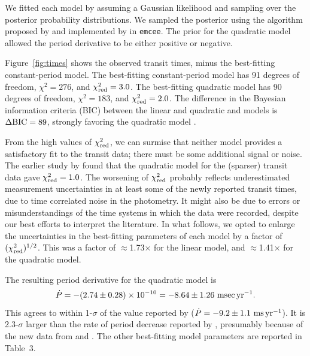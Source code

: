 \documentclass[12pt,twocolumn,tighten]{aastex62}
\begin{document}
We fitted each model by assuming a Gaussian likelihood and
sampling over the posterior probability distributions.  We sampled the
posterior using the algorithm proposed by
\citet{goodman_ensemble_2010} and implemented by
\citet{foreman-mackey_emcee_2013} in \texttt{emcee}.  The prior for
the quadratic model allowed the period derivative to be either positive
or negative.

Figure~\ref{fig:times} shows the observed transit times, minus the
best-fitting constant-period model.  The best-fitting constant-period
model has 91 degrees of freedom, $\chi^2 = 276$, and $\chi^2_{\rm
red}=3.0$.  The best-fitting quadratic model has 90 degrees of freedom,
$\chi^2 = 183$, and $\chi^2_{\rm red}=2.0$.  The difference in the
Bayesian information criteria (BIC) between the linear and quadratic
and models is $\Delta {\rm BIC} = 89$, strongly favoring the
quadratic model \citep{kass_bayes_1995}.

From the high values of $\chi^2_{\rm red}$, we can surmise that neither model
provides a satisfactory fit to the transit data; there
must be some additional signal or noise.
The earlier study by  found that the quadratic model for the
(sparser) transit data gave $\chi^2_{\rm red}=1.0$.  The worsening 
of $\chi^2_{\rm red}$ probably reflects underestimated measurement
uncertainties in at least some of the newly reported transit times,
due to time correlated noise in the photometry. It might also be due
to errors or misunderstandings of the time systems in which the
data were recorded, despite our best efforts to interpret the literature.
In what follows, we opted to enlarge the uncertainties in the best-fitting parameters
of each model by a factor of $(\chi^2_{\rm red})^{1/2}$.  This was a factor of $\approx$1.73$\times$ for the
linear model, and $\approx$1.41$\times$ for the quadratic model.

The resulting period derivative for the quadratic model is 
\begin{equation}
\dot{P}
  = - (2.74 \pm 0.28)\times 10^{-10}
  = - 8.64 \pm 1.26~{\rm msec}\,{\rm yr}^{-1}.
  \label{eq:dP_dt_obs}
\end{equation}
This agrees to within 1-$\sigma$ of the value reported by
\citet{southworth_transit_2019} ($\dot{P} = - 9.2 \pm 1.1~{\rm
ms}\,{\rm yr}^{-1}$).  It is 2.3-$\sigma$ larger than the rate
of period decrease reported by ,
presumably because of the new data from \citeauthor{southworth_transit_2019} and
\citeauthor{baluev_2019}. The other best-fitting model
parameters are reported in Table~3.
\end{document}
